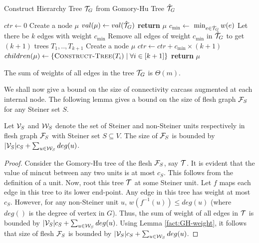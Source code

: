 \begin{algorithm}%
    \caption{Construct Hierarchy Tree ${\cal T}_G$ from Gomory-Hu Tree $\hat{ \cal T}_{G}$}
    \label{Construct Tree}
    \begin{algorithmic}[1] %
        \State $ctr \gets 0$
            \State Create a node $\mu$
            \State $val(\mu) \gets val(\hat{ \cal T}_{G})$
            \State \textbf{return} $\mu$
            \EndIf
            \State $c_{\min} \gets$ $\min_{e\in \hat{ \cal T}_{G}}w(e)$
            \State Let there be $k$ edges with weight $c_{\min}$
            \State Remove all edges of weight $c_{\min}$ in $\hat{ \cal T}_{G}$ to get $(k+1)$ trees $T_1,..,T_{k+1}$
            \State Create a node $\mu$
            \State $ctr \gets ctr + c_{\min}\times(k+1)$
            \State $children(\mu) \gets \{\textsc{Construct-Tree}(T_i)\;|\;\forall i\in [k+1]\}$
            \State \textbf{return} $\mu$
        \EndProcedure
    \end{algorithmic}
\end{algorithm}

\begin{lemma}
\label{lem:hierarchy-tree-weight}
The sum of weights of all edges in the tree ${\cal T}_G$ is ${\Theta}(m)$.
\end{lemma}
We shall now give a bound on the size of connectivity carcass augmented at each internal node. The following lemma gives a bound on the size of flesh graph ${\cal F}_S$ for any Steiner set $S$.

\begin{lemma}
Let ${\cal V}_S$ and ${\cal W}_S$ denote the set of Steiner and non-Steiner units respectively in flesh graph ${\cal F}_S$ with Steiner set $S\subseteq V$. The size of ${\cal F}_S$ is bounded by $|{\cal V}_S|c_S + \sum_{u\in {\cal W}_S}deg(u)$.
\label{lem:size-of-flesh}
\end{lemma}
\begin{proof}
Consider the Gomory-Hu tree of the flesh ${\cal F}_S$, say ${\cal T}$. It is evident that the value of mincut between any two units is at most $c_S$. This follows from the definition of a unit. Now, root this tree ${\cal T}$ at some Steiner unit. Let $f$ maps each edge in this tree to its lower end-point. Any edge in this tree has weight at most $c_S$. However, for any non-Steiner unit $u$, $w(f^{-1}(u)) \leq deg(u)$ (where $deg()$ is the degree of vertex in $G$).  Thus, the sum of weight of all edges in ${\cal T}$ is bounded by $|{\cal V}_S|c_S + \sum_{u\in {\cal W}_S}deg(u)$. Using Lemma \ref{fact:GH-weight}, it follows that size of flesh ${\cal F}_S$ is bounded by $|{\cal V}_S|c_S + \sum_{u\in {\cal W}_S}deg(u)$.
\end{proof}

